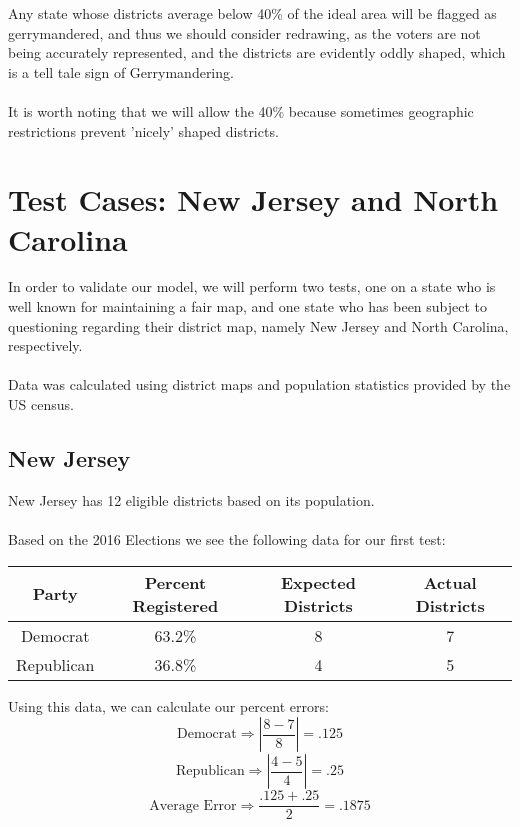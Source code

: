\documentclass[12pt]{article}
\begin{document}
	Any state whose districts average below 40\% of the ideal area will be flagged as gerrymandered, and thus we should consider redrawing, as the voters are not being accurately represented, and the districts are evidently oddly shaped, which is a tell tale sign of Gerrymandering.
	\\
	\\It is worth noting that we will allow the 40\% because sometimes geographic restrictions prevent 'nicely' shaped districts.

	\section{Test Cases: New Jersey and North Carolina}
	In order to validate our model, we will perform two tests, one on a state who is well known for maintaining a fair map, and one state who has been subject to questioning regarding their district map, namely New Jersey and North Carolina, respectively.  
	\\
	\\Data was calculated using district maps and population statistics provided by the US census.
	\subsection{New Jersey}
	New Jersey has 12 eligible districts based on its population.
	\\ \\
	Based on the 2016 Elections we see the following data for our first test\cite{njcensus}:
	\begin{center}
		\begin{tabular}{ c  c  c  c }
			
			\textbf{Party} & \textbf{Percent Registered} & \textbf{Expected Districts} & \textbf{Actual Districts}\\ 
			\hline
			Democrat & 63.2\% & 8 & 7\\
			
			Republican & 36.8\% & 4 & 5\\
			\hline
		\end{tabular}
	
	\end{center}

	\noindent
	Using this data, we can calculate our percent errors:
	\[\text{Democrat} \Rightarrow \left|\frac{8 - 7}{8}\right| = .125\]
	\[ \text{Republican} \Rightarrow \left|\frac{4 - 5}{4}\right| = .25\]
	\[\text{Average Error} \Rightarrow \frac{.125 + .25}{2} = .1875\]
	
\end{document}
